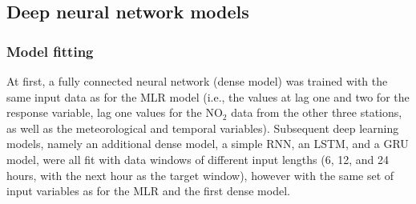



\subsection{Deep neural network models}

\subsubsection{Model fitting}
At first, a fully connected neural network (dense model) was trained with the same input data as for the MLR model (i.e., the values at lag one and two for the response variable, lag one values for the NO$_2$ data from the other three stations, as well as the meteorological and temporal variables). Subsequent deep learning models, namely an additional dense model, a simple RNN, an LSTM, and a GRU model, were all fit with data windows of different input lengths (6, 12, and 24 hours, with the next hour as the target window), however with the same set of input variables as for the MLR and the first dense model. 

